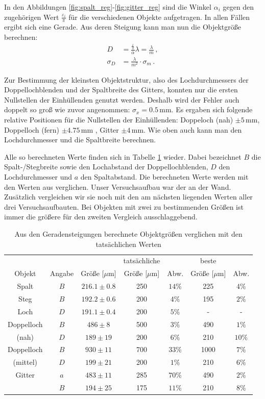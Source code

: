 \documentclass[12pt,a4paper,titlepage,headinclude,bibtotoc]{scrartcl}
\begin{document}
In den Abbildungen \ref{fig:spalt_reg}-\ref{fig:gitter_reg} sind die Winkel $\alpha_i$ gegen den zugehörigen Wert $\frac{\varepsilon_i}{\pi}$ für die verschiedenen Objekte aufgetragen.
In allen Fällen ergibt sich eine Gerade.
Aus deren Steigung kann man nun die Objektgröße berechnen:
\begin{align}
	D&=\frac{\frac{\varepsilon}{\pi}}{\alpha}\lambda=\frac{\lambda}{m}\,,
	\label{eq:objekt}\\
	\sigma_D&=\frac{\lambda}{m^2}\cdot \sigma_m\,.
\end{align}

Zur Bestimmung der kleinsten Objektstruktur, also des Lochdurchmessers der Doppellochblenden und der Spaltbreite des Gitters, konnten nur die ersten Nullstellen der Einhüllenden genutzt werden.
Deshalb wird der Fehler auch doppelt so groß wie zuvor angenommen: $\sigma_x=0.5\,$mm.
Es ergaben sich folgende relative Positionen für die Nullstellen der Einhüllenden: Doppeloch (nah) $\pm 5\,$mm, Doppelloch (fern) $\pm 4.75\,$mm , Gitter $\pm 4\,$mm.
Wie oben auch kann man den Lochdurchmesser und die Spaltbreite berechnen.

Alle so berechneten Werte finden sich in Tabelle \ref{tab:objektgroessen} wieder.
Dabei bezeichnet $B$ die Spalt-/Stegbreite sowie den Lochabstand der Doppellochblenden, $D$ den Lochdurchmesser und $a$ den Spaltabstand.
Die berechneten Werte werden mit den Werten aus \cite[S.196]{prakti} verglichen.
Unser Versuchsaufbau war der an der Wand.
Zusätzlich vergleichen wir sie noch mit den am nächsten liegenden Werten aller drei Versuchsaufbauten.
Bei Objekten mit zwei zu bestimmenden Größen ist immer die größere für den zweiten Vergleich ausschlaggebend.

\begin{table}[!htb]
	\centering
	\begin{tabular}{|c|c||c||c|c||c|c|}
		\hline
		 & & & tatsächliche &  & beste &  \\
		Objekt & Angabe & Größe [$\mu$m] & Größe [$\mu$m] & Abw. & Größe [$\mu$m] & Abw. \\
		\hline
		\hline
		Spalt & $B$ & $216.1 \pm 0.8$ & 250 & $14\%$ & 225 & $4\%$ \\
		Steg & $B$ & $192.2 \pm 0.6$ & 200 & $4\%$ & 195 & $2\%$ \\
		Loch & $D$ & $191.1 \pm 0.4$ & 200 & $5\%$ & - & - \\
		\hline
		Doppelloch & $B$ & $486 \pm 8$ & 500 & $3\%$ & 490 & $1\%$ \\
		(nah) & $D$ & $189 \pm 19$ & 200 & $6\%$ & 210 & $10\%$ \\
		\hline
		Doppelloch & $B$& $930 \pm 11$ & 700 & $33\%$ & 1000 & $7\%$ \\
		(mittel) & $D$& $199 \pm 21$ & 200 & $1\%$ & 210 & $6\%$ \\
		\hline		
		Gitter & $a$ & $483  \pm 11$ & 285 & $70\%$ & 490 & $2\%$ \\
		& $B$ & $194 \pm 25$ & 175 & $11\%$ & 210 & $8\%$ \\
		\hline
	\end{tabular}
	\caption{Aus den Geradensteigungen berechnete Objektgrößen verglichen mit den tatsächlichen Werten}
	\label{tab:objektgroessen}
\end{table}
\end{document}

